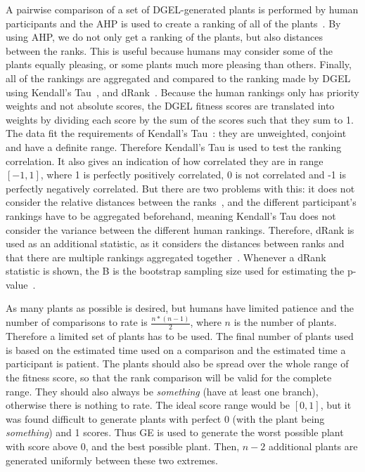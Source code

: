 A pairwise comparison of a set of \gls{DGEL}-generated plants is performed by human participants and the \gls{AHP} is used to create a ranking of all of the plants~\cite{2008Saaty}.
By using \gls{AHP}, we do not only get a ranking of the plants, but also distances between the ranks.
This is useful because humans may consider some of the plants equally pleasing, or some plants much more pleasing than others.
Finally, all of the rankings are aggregated and compared to the ranking made by \gls{DGEL} using Kendall's Tau~\cite{1938Kendall}, and dRank~\cite{2009Carterette}.
Because the human rankings only has priority weights and not absolute scores, the DGEL fitness scores are translated into weights by dividing each score by the sum of the scores such that they sum to 1.
The data fit the requirements of Kendall's Tau~\cite{2010Webber}: they are unweighted, conjoint and have a definite range.
Therefore Kendall's Tau is used to test the ranking correlation.
It also gives an indication of how correlated they are in range $[-1, 1]$, where 1 is perfectly positively correlated, 0 is not correlated and -1 is perfectly negatively correlated.
But there are two problems with this: it does not consider the relative distances between the ranks~\cite{2010Webber}, and the different participant's rankings have to be aggregated beforehand, meaning Kendall's Tau does not consider the variance between the different human rankings.
Therefore, dRank is used as an additional statistic, as it considers the distances between ranks and that there are multiple rankings aggregated together~\cite{2010Webber,2009Carterette}.
Whenever a dRank statistic is shown, the B is the bootstrap sampling size used for estimating the p-value~\cite{2009Carterette}.

As many plants as possible is desired, but humans have limited patience and the number of comparisons to rate is $\frac{n * (n - 1)}{2}$, where $n$ is the number of plants.
Therefore a limited set of plants has to be used.
The final number of plants used is based on the estimated time used on a comparison and the estimated time a participant is patient.
The plants should also be spread over the whole range of the fitness score, so that the rank comparison will be valid for the complete range.
They should also always be \textit{something} (have at least one branch), otherwise there is nothing to rate.
The ideal score range would be $[0, 1]$, but it was found difficult to generate plants with perfect 0 (with the plant being \textit{something}) and 1 scores.
Thus \gls{GE} is used to generate the worst possible plant with score above 0, and the best possible plant.
Then, $n - 2$ additional plants are generated uniformly between these two extremes.

